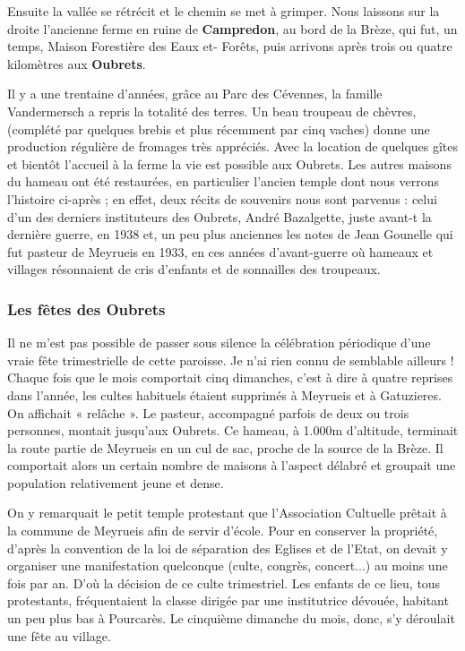 Ensuite la vallée se rétrécit et le chemin se met à grimper. Nous laissons sur la droite
l’ancienne ferme en ruine de \textbf{Campredon}, au bord de la Brèze, qui fut, un temps, Maison
Forestière des Eaux et- Forêts, puis arrivons après trois ou quatre kilomètres aux \textbf{Oubrets}.

Il y a une trentaine d’années, grâce au Parc des Cévennes, la famille Vandermersch a repris la
totalité des terres. Un beau troupeau de chèvres, (complété par quelques brebis et plus
récemment par cinq vaches) donne une production régulière de fromages très appréciés.
Avec la location de quelques gîtes et bientôt l’accueil à la ferme la vie est possible aux
Oubrets. Les autres maisons du hameau ont été restaurées, en particulier l’ancien temple dont
nous verrons l’histoire ci-après ; en effet, deux récits de souvenirs nous sont parvenus : celui
d’un des derniers instituteurs des Oubrets, André Bazalgette, juste avant-t la dernière guerre,
en 1938 et, un peu plus anciennes les notes de Jean Gounelle qui fut pasteur de Meyrueis en
1933, en ces années d’avant-guerre où hameaux et villages résonnaient de cris d’enfants et de
sonnailles des troupeaux.


\subsubsection{Les fêtes des Oubrets}

Il ne m’est pas possible de passer sous silence la célébration périodique d’une vraie
fête trimestrielle de cette paroisse. Je n’ai rien connu de semblable ailleurs ! Chaque
fois que le mois comportait cinq dimanches, c’est à dire à quatre reprises dans
l’année, les cultes habituels étaient supprimés à Meyrueis et à Gatuzieres. On affichait
« relâche ». Le pasteur, accompagné parfois de deux ou trois personnes, montait
jusqu’aux Oubrets. Ce hameau, à 1.000m d’altitude, terminait la route partie de
Meyrueis en un cul de sac, proche de la source de la Brèze. Il comportait alors un
certain nombre de maisons à l’aspect délabré et groupait une population relativement
jeune et dense.

On y remarquait le petit temple protestant que l’Association Cultuelle prêtait à la
commune de Meyrueis afin de servir d’école. Pour en conserver la propriété, d’après
la convention de la loi de séparation des Eglises et de l’Etat, on devait y organiser une
manifestation quelconque (culte, congrès, concert...) au moins une fois par an. D’où
la décision de ce culte trimestriel. Les enfants de ce lieu, tous protestants,
fréquentaient la classe dirigée par une institutrice dévouée, habitant un peu plus bas à
Pourcarès. Le cinquième dimanche du mois, donc, s’y déroulait une fête au village.

